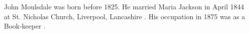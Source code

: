 
John Moulsdale was born before 1825.  He married Maria Jackson in April 1844 at St. Nicholas Church, Liverpool, Lancashire \cite{JohnMoulsdaleMarriage}.  His occupation in 1875 	was as a Book-keeper \cite{JohnMoulsdaleOccupation}.
